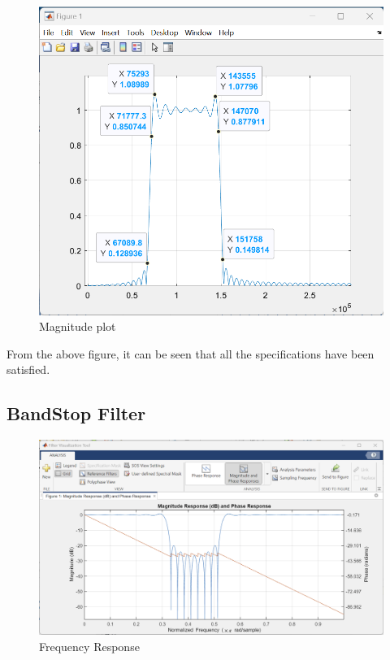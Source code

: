 \documentclass{article}
\begin{document}
\begin{figure}[h!]

\centering
\includegraphics[scale = 0.58]{Freq Res.png}
\caption{Magnitude plot}
\end{figure}

From the above figure, it can be seen that all the specifications have been satisfied.

\subsection{BandStop Filter}

\begin{figure}[h!]

\centering
\includegraphics[scale = 0.6]{Bandstop_Mag.png}
\caption{Frequency Response}
\end{figure}
\end{document}
